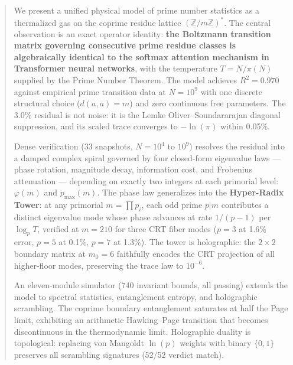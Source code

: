\documentclass[
  11pt,
]{article}
\numberwithin{equation}{section}
\begin{document}
\begin{abstract}
\setlength{\parskip}{6pt plus 2pt minus 1pt}
We present a unified physical model of prime number statistics as a
thermalized gas on the coprime residue lattice
\((\mathbb{Z}/m\mathbb{Z})^*\). The central observation is an exact
operator identity: \textbf{the Boltzmann transition matrix governing
consecutive prime residue classes is algebraically identical to the
softmax attention mechanism in Transformer neural networks}, with the
temperature \(T = N/\pi(N)\) supplied by the Prime Number Theorem. The
model achieves \(R^2 = 0.970\) against empirical prime transition data
at \(N = 10^9\) with one discrete structural choice (\(d(a,a) = m\)) and
zero continuous free parameters. The 3.0\% residual is not noise: it is
the Lemke Oliver--Soundararajan diagonal suppression, and its scaled
trace converges to \(-\ln(\pi)\) within 0.05\%.

Dense verification (33 snapshots, \(N = 10^4\) to \(10^9\)) resolves the
residual into a damped complex spiral governed by four closed-form
eigenvalue laws --- phase rotation, magnitude decay, information cost,
and Frobenius attenuation --- depending on exactly two integers at each
primorial level: \(\varphi(m)\) and \(p_{\max}(m)\). The phase law
generalizes into the \textbf{Hyper-Radix Tower}: at any primorial
\(m = \prod p_i\), each odd prime \(p | m\) contributes a distinct
eigenvalue mode whose phase advances at rate \(1/(p-1)\) per
\(\log_p T\), verified at \(m = 210\) for three CRT fiber modes
(\(p = 3\) at 1.6\% error, \(p = 5\) at 0.1\%, \(p = 7\) at 1.3\%). The
tower is holographic: the \(2 \times 2\) boundary matrix at \(m_0 = 6\)
faithfully encodes the CRT projection of all higher-floor modes,
preserving the trace law to \(10^{-6}\).

An eleven-module simulator (740 invariant bounds, all passing) extends
the model to spectral statistics, entanglement entropy, and holographic
scrambling. The coprime boundary entanglement saturates at half the Page
limit, exhibiting an arithmetic Hawking--Page transition that becomes
discontinuous in the thermodynamic limit. Holographic duality is
topological: replacing von Mangoldt \(\ln(p)\) weights with binary
\(\{0,1\}\) preserves all scrambling signatures (52/52 verdict match).



\end{abstract}

\clearpage
\tableofcontents
\clearpage

\setcounter{section}{1}\setcounter{equation}{0}
\setcounter{section}{1}\setcounter{equation}{0}
\end{document}
